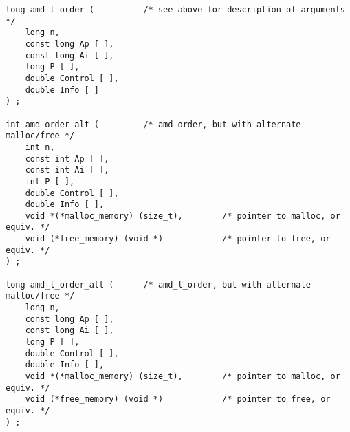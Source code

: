 \documentclass[11pt]{article}
\begin{document}
{\begin{verbatim}
long amd_l_order (          /* see above for description of arguments */
    long n,
    const long Ap [ ],
    const long Ai [ ],
    long P [ ],
    double Control [ ],
    double Info [ ]
) ;

int amd_order_alt (         /* amd_order, but with alternate malloc/free */
    int n,
    const int Ap [ ],
    const int Ai [ ],
    int P [ ],
    double Control [ ],
    double Info [ ],
    void *(*malloc_memory) (size_t),        /* pointer to malloc, or equiv. */
    void (*free_memory) (void *)            /* pointer to free, or equiv. */
) ;

long amd_l_order_alt (      /* amd_l_order, but with alternate malloc/free */
    long n,
    const long Ap [ ],
    const long Ai [ ],
    long P [ ],
    double Control [ ],
    double Info [ ],
    void *(*malloc_memory) (size_t),        /* pointer to malloc, or equiv. */
    void (*free_memory) (void *)            /* pointer to free, or equiv. */
) ;


\end{verbatim}}
\end{document}

